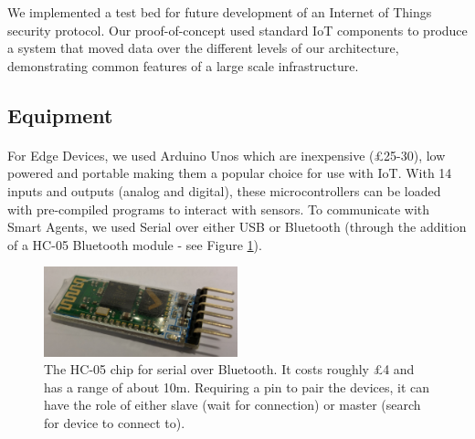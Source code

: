 

We implemented a test bed for future development of an Internet of Things security protocol. Our proof-of-concept used standard IoT components to produce a system that moved data over the different levels of our architecture, demonstrating common features of a large scale infrastructure.




\subsection{Equipment}
\paragraph{}
For Edge Devices, we used Arduino Unos which are inexpensive (£25-30), low powered and portable making them a popular choice for use with IoT. With 14 inputs and outputs (analog and digital), these microcontrollers can be loaded with pre-compiled programs to interact with sensors. To communicate with Smart Agents, we used Serial over either USB or Bluetooth (through the addition of a HC-05 Bluetooth module - see Figure \ref{fig:HC-05}).


\begin{figure}
    \centering
    \includegraphics[width=0.5\textwidth]{HC05.jpg}
    \caption{The HC-05 chip for serial over Bluetooth. It costs roughly £4 and has a range of about 10m. Requiring a pin to pair the devices, it can have the role of either slave (wait for connection) or master (search for device to connect to).}
    \label{fig:HC-05}
\end{figure}

